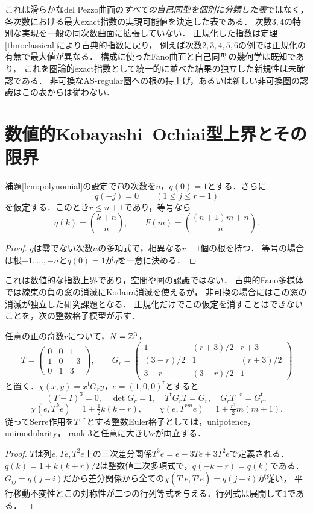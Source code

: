 \documentclass[11pt,a4paper]{ltjsarticle}
\begin{document}
\begin{remark}[この表の意味と新規性の範囲]\label{rem:delpezzo-exact-scope}
これは滑らかなdel Pezzo曲面の\emph{すべての自己同型を個別に分類した表}ではなく，
各次数における最大exact指数の実現可能値を決定した表である．
次数$3,4$の特別な実現を一般の同次数曲面に拡張していない．
正規化した指数は定理\ref{thm:classical}により古典的指数に戻り，
例えば次数$2,3,4,5,6$の例では正規化の有無で最大値が異なる．
構成に使ったFano曲面と自己同型の幾何学は既知であり，
これを圏論的exact指数として統一的に並べた結果の独立した新規性は未確認である．
非可換なAS-regular圏への根の持上げ，あるいは新しい非可換圏の認識はこの表からは従わない．
\end{remark}


\section{数値的Kobayashi--Ochiai型上界とその限界}
\begin{proposition}[負の窓を仮定した指数上界]\label{prop:window}
補題\ref{lem:polynomial}の設定で$F$の次数を$n$，$q(0)=1$とする．さらに
\[
 q(-j)=0\qquad(1\le j\le r-1)
\]
を仮定する．このとき$r\le n+1$であり，等号なら
\[
 q(k)=\binom{k+n}{n},\qquad F(m)=\binom{(n+1)m+n}{n}.
\]
\end{proposition}
\begin{proof}
$q$は零でない次数$n$の多項式で，相異なる$r-1$個の根を持つ．
等号の場合は根$-1,\ldots,-n$と$q(0)=1$が$q$を一意に決める．
\end{proof}

これは数値的な指数上界であり，空間や圏の認識ではない．
古典的Fano多様体では線束の負の窓の消滅にKodaira消滅を使えるが，
非可換の場合にはこの窓の消滅が独立した研究課題となる．
正規化だけでこの仮定を消すことはできないことを，次の整数格子模型が示す．

\begin{proposition}[任意に大きい奇数指数の数値模型]\label{prop:lattice-model}
任意の正の奇数$r$について，$N=\mathbb Z^3$，
\[
 T=\begin{pmatrix}0&0&1\\1&0&-3\\0&1&3\end{pmatrix},\qquad
 G_r=\begin{pmatrix}
 1&(r+3)/2&r+3\\
 (3-r)/2&1&(r+3)/2\\
 3-r&(3-r)/2&1
 \end{pmatrix}
\]
と置く．$\chi(x,y)=x^{\mathsf t}G_ry$，$e=(1,0,0)^{\mathsf t}$とすると
\[
 (T-I)^3=0,\quad\det G_r=1,\quad T^{\mathsf t}G_rT=G_r,
 \quad G_rT^{-r}=G_r^{\mathsf t},
\]
\[
 \chi(e,T^ke)=1+\tfrac12k(k+r),\qquad
 \chi(e,T^{rm}e)=1+\tfrac{r^2}{2}m(m+1).
\]
従ってSerre作用を$T^{-r}$とする整数Euler格子としては，unipotence，unimodularity，
rank $3$と任意に大きい$r$が両立する．
\end{proposition}
\begin{proof}
$T$は列$e,Te,T^2e$上の三次差分関係$T^3e=e-3Te+3T^2e$で定義される．
$q(k)=1+k(k+r)/2$は整数値二次多項式で，$q(-k-r)=q(k)$である．
$G_{ij}=q(j-i)$だから差分関係から全ての$\chi(T^ie,T^je)=q(j-i)$が従い，
平行移動不変性とこの対称性が二つの行列等式を与える．行列式は展開して$1$である．
\end{proof}
\end{document}

